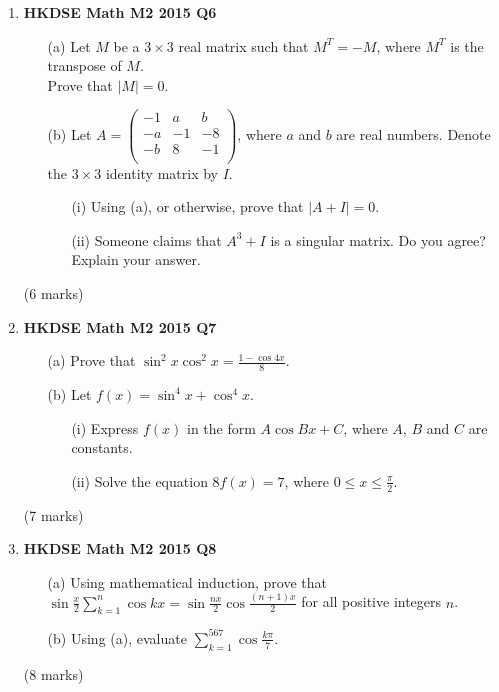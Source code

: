 \documentclass{report}
\begin{document}
\begin{enumerate}
	\item \textbf{HKDSE Math M2 2015 Q6}
	\begin{enumerate}
		\item [(a)]Let $M$ be a $3 \times 3$ real matrix such that $M^T = -M$, where $M^T$ is the transpose of $M$.\\
		Prove that $|M| = 0$.
		\item [(b)]Let $A = \begin{pmatrix}
			-1&a&b\\
			-a&-1&-8\\
			-b&8&-1\\
		\end{pmatrix}$, where $a$ and $b$ are real numbers. Denote the $3 \times 3$ identity matrix by $I$.
		\begin{enumerate}
			\item [(i)]Using (a), or otherwise, prove that $|A+I| = 0$. 
			\item [(ii)]Someone claims that $A^3 + I$ is a singular matrix. Do you agree? Explain your answer.
		\end{enumerate}
	\end{enumerate}
	(6 marks)

	\item \textbf{HKDSE Math M2 2015 Q7}
	\begin{enumerate}
		\item [(a)]Prove that $\sin^2{x}\cos^2{x} = \displaystyle\frac{1 - \cos{4x}}{8}$. 
		\item [(b)]Let $f(x) = \sin^4{x} + \cos^4{x}$. 
		\begin{enumerate}
			\item [(i)]Express $f(x)$ in the form $A\cos{Bx} + C$, where $A$, $B$ and $C$ are constants.
			\item [(ii)]Solve the equation $8f(x) = 7$, where $ 0\leq  x \leq \displaystyle\frac{\pi}{2}$.
		\end{enumerate}
	\end{enumerate}
	(7 marks)

	\item \textbf{HKDSE Math M2 2015 Q8}
	\begin{enumerate}
		\item [(a)]Using mathematical induction, prove that $\sin{\displaystyle\frac{x}{2}} \displaystyle\sum_{k = 1}^{n}\cos{kx} = \sin{\displaystyle\frac{nx}{2}}\cos{\displaystyle\frac{(n+1)x}{2}}$ for all positive integers $n$. 
		\item [(b)]Using (a), evaluate $\displaystyle\sum_{k = 1}^{567}\cos{\displaystyle\frac{k\pi}{7}}$.
	\end{enumerate}
	(8 marks)


\end{enumerate}
\end{document}
